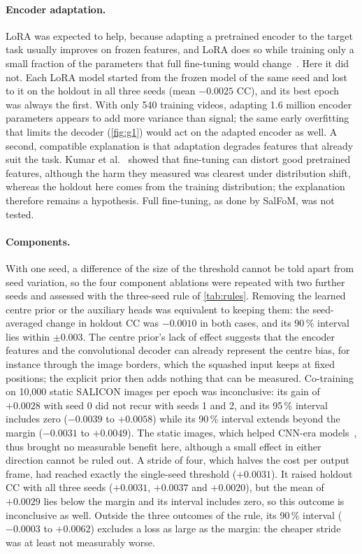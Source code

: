 \paragraph{Encoder adaptation.} \acrshort{LoRA} was expected to help, because adapting a
pretrained encoder to the target task usually improves on frozen features, and
\acrshort{LoRA} does so while training only a small fraction of the parameters that full
fine-tuning would change~\cite{hu2022lora}. Here it did not. Each \acrshort{LoRA} model
started from the frozen model of the same seed and lost to it on the holdout in
all three seeds (mean $-0.0025$ \acrshort{CC}), and its best epoch was always the first.
With only 540 training videos, adapting 1.6 million encoder parameters appears
to add more variance than signal; the same early overfitting that limits the
decoder (\cref{fig:g1}) would act on the adapted encoder as well. A second,
compatible explanation is that adaptation degrades features that already suit
the task. Kumar et al.~\cite{kumar2022fine} showed that fine-tuning can distort
good pretrained features, although the harm they measured was clearest under
distribution shift, whereas the holdout here comes from the training
distribution; the explanation therefore remains a hypothesis. Full fine-tuning,
as done by SalFoM, was not tested.

\paragraph{Components.} With one seed, a difference of the size of the
threshold cannot be told apart from seed variation, so the four component
ablations were repeated with two further seeds and assessed with the
three-seed rule of \cref{tab:rules}. Removing the learned centre prior or the
auxiliary heads was equivalent to keeping them: the seed-averaged change in
holdout \acrshort{CC} was $-0.0010$ in both cases, and its 90\,\% interval lies within
$\pm0.003$. The centre prior's lack of effect suggests that the encoder
features and the convolutional decoder can already represent the centre bias,
for instance through the image borders, which the squashed input keeps at
fixed positions; the explicit prior then adds nothing that can be measured.
Co-training on 10,000 static SALICON images per epoch was inconclusive: its gain
of $+0.0028$ with seed 0 did not recur with seeds 1 and 2, and its 95\,\%
interval includes zero ($-0.0039$ to $+0.0058$) while its 90\,\% interval
extends beyond the margin ($-0.0031$ to $+0.0049$).
The static images, which helped \acrshort{CNN}-era models~\cite{wang2018revisiting},
thus brought no measurable benefit here, although a small effect in either
direction cannot be ruled out. A stride of four, which halves the cost per
output frame, had reached exactly the single-seed threshold ($+0.0031$). It
raised holdout \acrshort{CC} with all three seeds ($+0.0031$, $+0.0037$ and $+0.0020$),
but the mean of $+0.0029$ lies below the margin and its interval includes zero,
so this outcome is inconclusive as well. Outside the three outcomes of the
rule, its 90\,\% interval ($-0.0003$ to $+0.0062$) excludes a loss as large as
the margin: the cheaper stride was at least not measurably worse.


